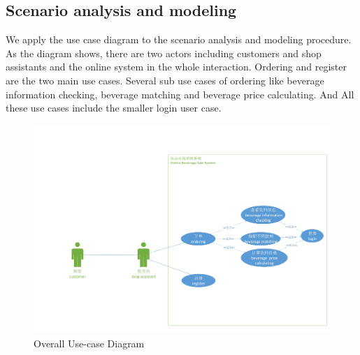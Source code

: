 \documentclass[a4paper]{report}
\begin{document}
\subsection{Scenario analysis and modeling}
We apply the use case diagram to the scenario analysis and modeling procedure. As the diagram shows, there are two actors including customers and shop assistants and the online  system in the whole interaction. Ordering and register are the  two main use cases. Several sub use cases of ordering like beverage information checking, beverage matching and beverage price calculating. And All these use cases include the smaller login user case.
\begin{figure}
  \centering
  \includegraphics[scale=0.44]{figure1.jpg}
  \caption{Overall Use-case Diagram}\label{2}
\end{figure}
\end{document}

